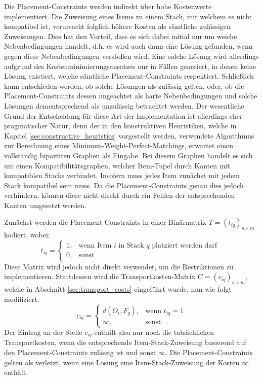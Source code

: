 Die Placement-Constraints werden indirekt über hohe Kostenwerte implementiert. Die Zuweisung eines Items zu einem
Stack, mit welchem es nicht kompatibel ist, verursacht folglich höhere Kosten als sämtliche zulässigen Zuweisungen.
Dies hat den Vorteil, dass es sich dabei initial nur um weiche Nebenbedingungen handelt,
d.h. es wird auch dann eine Lösung gefunden, wenn gegen diese Nebenbedingungen verstoßen wird.
Eine solche Lösung wird allerdings aufgrund des Kostenminimierungsansatzes nur in Fällen generiert,
in denen keine Lösung existiert, welche sämtliche Placement-Constraints respektiert.
Schließlich kann entschieden werden, ob solche Lösungen als zulässig gelten,
oder, ob die Placement-Constraints dessen ungeachtet als harte Nebenbedingungen und solche
Lösungen dementsprechend als unzulässig betrachtet werden.
Der wesentliche Grund der Entscheidung für diese Art der Implementation ist allerdings eher pragmatischer Natur, denn der in den konstruktiven Heuristiken, welche in Kapitel \ref{sec:constructive_heuristics} vorgestellt werden, verwendete Algorithmus zur Berechnung eines Minimum-Weight-Perfect-Matchings, erwartet einen vollständig bipartiten Graphen als Eingabe. Bei diesem Graphen handelt es sich um einen Kompatibilitätsgraphen, welcher Item-Tupel durch Kanten mit kompatiblen Stacks verbindet. Insofern muss jedes Item zunächst mit jedem Stack kompatibel sein muss. Da die Placement-Constraints genau dies jedoch verhindern, können diese nicht direkt durch ein Fehlen der entsprechenden Kanten umgesetzt werden.

Zunächst werden die Placement-Constraints in einer Binärmatrix $T = (t_{iq})_{n \times m}$ kodiert, wobei:
\[
    t_{iq} =
\begin{cases}
    1, & \text{wenn Item $i$ in Stack $q$ platziert werden darf }\\
    0, & \text{sonst}
\end{cases}
\]
Diese Matrix wird jedoch nicht direkt verwendet, um die Restriktionen zu implementieren. Stattdessen wird
die Transportkosten-Matrix $C = (c_{iq})_{n \times m}$, welche in Abschnitt \ref{sec:transport_costs} eingeführt wurde, nun wie folgt modifiziert.
\[
    c_{iq} =
\begin{cases}
    d(O_i, F_q), & \text{wenn $t_{iq} = 1$}\\
    \infty, & \text{sonst}
\end{cases}
\]
Der Eintrag an der Stelle $c_{iq}$ enthält also nur noch die tatsächlichen Transportkosten, wenn die
entsprechende Item-Stack-Zuweisung basierend auf den Placement-Constraints zulässig ist und sonst $\infty$.
Die Placement-Constraints gelten als verletzt, wenn eine Lösung eine Item-Stack-Zuweisung
der Kosten $\infty$ enthält.

